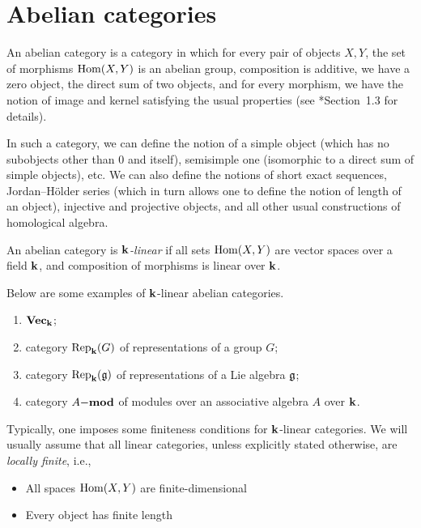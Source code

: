 \section{Abelian categories}\label{s:abelian-cats}
\begin{definition}\label{d:abelian}
  An abelian category is a category in which for every pair of objects $X,Y$,
  the set of morphisms $\Hom(X,Y)$ is an abelian group, composition is
  additive, we have a zero object, the direct sum of two objects, and for every
  morphism, we have the notion of image and kernel satisfying the usual
  properties (see *{Section~1.3} for details).
\end{definition}
In such a category, we can define the notion of a simple object (which has no
subobjects other than $0$ and itself), semisimple one (isomorphic to a direct
sum of simple objects), etc. We can also define the notions of short exact
sequences, Jordan--H\"older series (which in turn allows one to define the
notion of length of an object), injective and projective objects, and all
other usual constructions of homological algebra.

An abelian category is
\emph{$\kk$-linear} if all sets
$\Hom(X,Y)$ are vector spaces over a field $\kk$, and composition of morphisms
is linear over $\kk$.

\begin{example}
  Below are some examples of $\kk$-linear abelian categories.

  \begin{enumerate}
    \item $\vect_\kk$;
    \item category $\Rep_\kk(G)$ of representations of a group $G$;
    \item category $\Rep_\kk(\g)$ of representations of a Lie algebra $\g$;
    \item category $A\mod$ of modules over an associative algebra $A$
      over $\kk$.
  \end{enumerate}

\end{example}

Typically, one imposes some finiteness conditions for $\kk$-linear
categories. We will usually assume that all linear categories, unless
explicitly stated otherwise, are
\emph{locally finite}, i.e.,

\begin{itemize}
  \item All spaces $\Hom(X,Y)$ are finite-dimensional
  \item Every object has finite length
\end{itemize}

